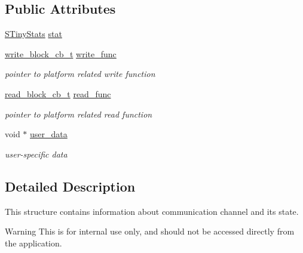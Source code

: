 \subsection*{Public Attributes}
\begin{DoxyCompactItemize}
\item 
\hyperlink{structSTinyStats}{S\+Tiny\+Stats} \hyperlink{structSTinyLightData_a623323a7a84807b5ce14a7cb56ec07f0}{stat}
\item 
\mbox{\label{structSTinyLightData_a0bd1b1a01e1eaa15f22dec1e886c2e3c}} 
\hyperlink{tiny__types_8h_aafd634660bba76cace57a8f9b01e044d}{write\+\_\+block\+\_\+cb\+\_\+t} \hyperlink{structSTinyLightData_a0bd1b1a01e1eaa15f22dec1e886c2e3c}{write\+\_\+func}
\begin{DoxyCompactList}\small\item\em pointer to platform related write function \end{DoxyCompactList}\item 
\mbox{\label{structSTinyLightData_af9b045852adb08c137abce21d02f00ea}} 
\hyperlink{tiny__types_8h_a15bec127d9ee63658563d62e92b5261b}{read\+\_\+block\+\_\+cb\+\_\+t} \hyperlink{structSTinyLightData_af9b045852adb08c137abce21d02f00ea}{read\+\_\+func}
\begin{DoxyCompactList}\small\item\em pointer to platform related read function \end{DoxyCompactList}\item 
\mbox{\label{structSTinyLightData_a5208b2627e6bda09c3b839f4d1ad2815}} 
void $\ast$ \hyperlink{structSTinyLightData_a5208b2627e6bda09c3b839f4d1ad2815}{user\+\_\+data}
\begin{DoxyCompactList}\small\item\em user-\/specific data \end{DoxyCompactList}\end{DoxyCompactItemize}


\subsection{Detailed Description}
This structure contains information about communication channel and its state. \begin{DoxyWarning}{Warning}
This is for internal use only, and should not be accessed directly from the application. 
\end{DoxyWarning}



